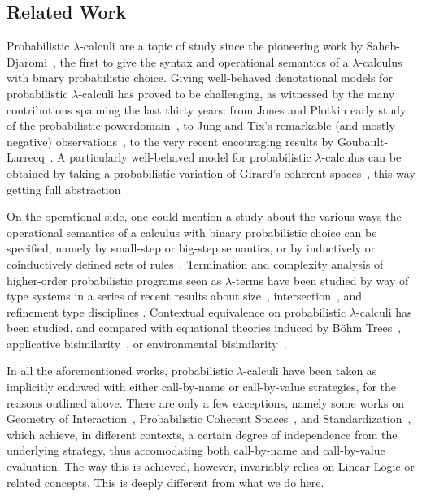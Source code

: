 \documentclass[runningheads]{llncs}
\theoremstyle{definition}
\theoremstyle{plain}
\newcommand\+[1][{}]{\kern1pt{\smallbin\oplus}_{#1}\kern1pt}
\newcommand\1{\bullet}
\newcommand\0{\circ}
\begin{document}
\subsection{Related Work}

Probabilistic $\lambda$-calculi are a topic of study since the pioneering work by Saheb-Djaromi~\cite{SahebDjahromi78}, the first to give the syntax and operational semantics of a $\lambda$-calculus with binary probabilistic choice. Giving well-behaved denotational models for probabilistic $\lambda$-calculi has proved to be challenging, as witnessed by the many contributions spanning the last thirty years: from Jones and Plotkin early study of the probabilistic powerdomain~\cite{JonesPlotkin89}, to Jung and Tix's remarkable (and mostly negative) observations~\cite{JungTix98}, to the very recent encouraging results by Goubault-Larrecq~\cite{GoubaultLarrecq19}. A particularly well-behaved model for probabilistic $\lambda$-calculus can be obtained by taking a probabilistic variation of Girard's coherent spaces~\cite{DanosEhrhard11}, this way getting full abstraction~\cite{EPT18}.

On the operational side, one could mention a study about the various ways the operational semantics of a calculus with binary probabilistic choice can be specified, namely by small-step or big-step semantics, or by inductively or coinductively defined sets of rules~\cite{DalLagoZorzi12}. Termination and complexity analysis of higher-order probabilistic programs seen as $\lambda$-terms have been studied by way of type systems in a series of recent results about size~\cite{DalLagoGrellois19}, intersection~\cite{BreuvartDalLago18}, and refinement type disciplines \cite{AvanziniDalLagoGhyselen19}. Contextual equivalence on probabilistic $\lambda$-calculi has been studied, and compared with equational theories induced by B\"ohm Trees~\cite{Leventis18}, applicative bisimilarity~\cite{DalLagoSangiorgiAlberti14}, or environmental bisimilarity~\cite{SangiorgiVignudelli16}.

In all the aforementioned works, probabilistic $\lambda$-calculi have been taken as implicitly endowed with either call-by-name or call-by-value strategies, for the reasons outlined above. There are only a few exceptions, namely some works on Geometry of Interaction~\cite{DLFVY17}, Probabilistic Coherent Spaces~\cite{EhrhardTasson19}, and Standardization~\cite{FaggianRonchi19}, which achieve, in different contexts, a certain degree of independence from the underlying strategy, thus accomodating both call-by-name and call-by-value evaluation. The way this is achieved, however, invariably relies on Linear Logic or related concepts. This is deeply different from what we do here.
\end{document}
